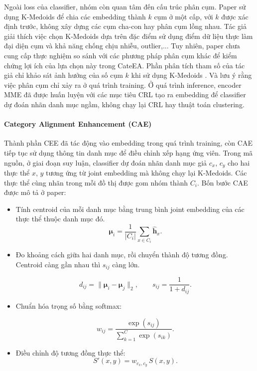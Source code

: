 Ngoài loss của classifier, nhóm còn quan tâm đến cấu trúc phân cụm. Paper sử dụng K-Medoids để chia các embedding thành $k$ cụm ở một cấp, với $k$ được xác định trước, không xây dựng các cụm cha-con hay phân cụm lồng nhau. Tác giả giải thích việc chọn K-Medoids dựa trên đặc điểm sử dụng điểm dữ liệu thực làm đại diện cụm và khả năng chống chịu nhiễu, outlier,... Tuy nhiên, paper chưa cung cấp thực nghiệm so sánh với các phương pháp phân cụm khác để kiểm chứng lợi ích của lựa chọn này trong CateEA. Phần phân tích tham số của tác giả chỉ khảo sát ảnh hưởng của số cụm $k$ khi sử dụng K-Medoids \cite{feng-etal-2025-cateea}. Và lưu ý rằng việc phân cụm chỉ xảy ra ở quá trình training. Ở quá trình inference, encoder MME đã được huấn luyện với các mục tiêu CRL tạo ra embedding để classifier dự đoán nhãn danh mục ngầm, không chạy lại CRL hay thuật toán clustering.

\paragraph{Category Alignment Enhancement (CAE)}

Thành phần CEE đã tác động vào embedding trong quá trình training, còn CAE tiếp tục sử dụng thông tin danh mục để điều chỉnh xếp hạng ứng viên. Trong mã nguồn, ở giai đoạn suy luận, classifier dự đoán nhãn danh mục giả $c_x$, $c_y$ cho hai thực thể $x$, $y$ tương ứng từ joint embedding mà không chạy lại K-Medoids. Các thực thể cùng nhãn trong mỗi đồ thị được gom nhóm thành $C_i$. Bốn bước CAE được mô tả ở paper:

\begin{itemize}
    \item Tính centroid của mỗi danh mục bằng trung bình joint embedding của các thực thể thuộc danh mục đó.
    \[
        \boldsymbol{\mu}_i
        = \frac{1}{|C_i|}
        \sum_{x \in C_i} \hat{\mathbf{h}}_x.
    \]
    \item Đo khoảng cách giữa hai danh mục, rồi chuyển thành độ tương đồng. Centroid càng gần nhau thì $s_{ij}$ càng lớn.

    \[
        d_{ij} = \|\boldsymbol{\mu}_i - \boldsymbol{\mu}_j\|_2,
        \qquad
        s_{ij} = \frac{1}{1 + d_{ij}}.
    \]
    \item Chuẩn hóa trọng số bằng softmax:

    \[
        w_{ij}
        = \frac{\exp(s_{ij})}
        {\sum_{k=1}^{C} \exp(s_{ik})}.
    \]
    \item Điều chỉnh độ tương đồng thực thể:
    \[
        S'(x,y)
        = w_{c_x,c_y}\,S(x,y).
    \]
\end{itemize}

